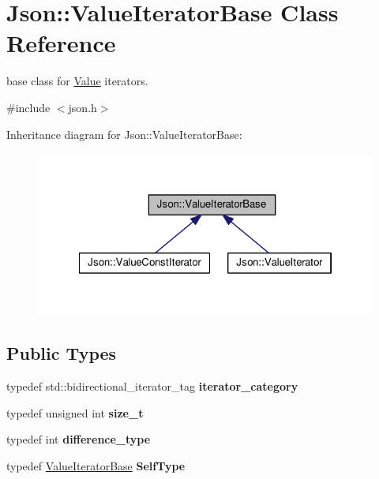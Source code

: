 \hypertarget{class_json_1_1_value_iterator_base}{}\section{Json\+:\+:Value\+Iterator\+Base Class Reference}
\label{class_json_1_1_value_iterator_base}


base class for \hyperlink{class_json_1_1_value}{Value} iterators.  




{\ttfamily \#include $<$json.\+h$>$}



Inheritance diagram for Json\+:\+:Value\+Iterator\+Base\+:
\nopagebreak
\begin{figure}[H]
\begin{center}
\leavevmode
\includegraphics[width=322pt]{class_json_1_1_value_iterator_base__inherit__graph}
\end{center}
\end{figure}
\subsection*{Public Types}
\begin{DoxyCompactItemize}
\item 
typedef std\+::bidirectional\+\_\+iterator\+\_\+tag {\bfseries iterator\+\_\+category}\hypertarget{class_json_1_1_value_iterator_base_a02fd11a4fbdc0007da1e8bcf5e6b83c3}{}\label{class_json_1_1_value_iterator_base_a02fd11a4fbdc0007da1e8bcf5e6b83c3}

\item 
typedef unsigned int {\bfseries size\+\_\+t}\hypertarget{class_json_1_1_value_iterator_base_a9d3a3c7ce5cdefe23cb486239cf07bb5}{}\label{class_json_1_1_value_iterator_base_a9d3a3c7ce5cdefe23cb486239cf07bb5}

\item 
typedef int {\bfseries difference\+\_\+type}\hypertarget{class_json_1_1_value_iterator_base_a4e44bf8cbd17ec8d6e2c185904a15ebd}{}\label{class_json_1_1_value_iterator_base_a4e44bf8cbd17ec8d6e2c185904a15ebd}

\item 
typedef \hyperlink{class_json_1_1_value_iterator_base}{Value\+Iterator\+Base} {\bfseries Self\+Type}\hypertarget{class_json_1_1_value_iterator_base_a9d2a940d03ea06d20d972f41a89149ee}{}\label{class_json_1_1_value_iterator_base_a9d2a940d03ea06d20d972f41a89149ee}

\end{DoxyCompactItemize}
